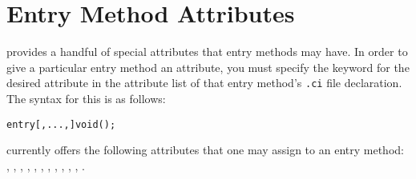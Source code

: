 \section{Entry Method Attributes}

\label{attributes}

\charmpp{}  provides a handful of special attributes that entry methods may have.  In order to give a particular entry method an attribute, you must specify the keyword for the desired
attribute in the attribute list of that entry method's {\tt .ci} file
declaration.  The syntax for this is as follows:

\begin{alltt}
entry [, ..., ] void ();
\end{alltt}

\charmpp{} currently offers the following attributes that one may assign to 
an entry method:
, , , , , , , , , , , .

